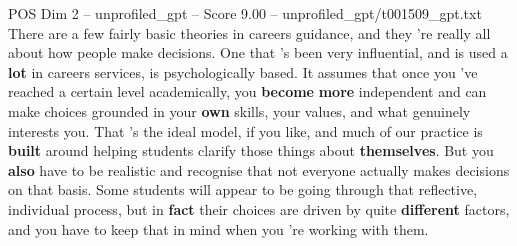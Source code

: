 \begin{textsample}{POS Dim 2 – unprofiled\_gpt – Score 9.00 – unprofiled\_gpt/t001509\_gpt.txt}  \label{ex:f2_pos_021}
There are a few fairly basic theories in careers guidance, and they ’re really all about how people make decisions.
One that ’s been very influential, and is used a \textbf{lot} in careers services, is psychologically based.
It assumes that once you ’ve reached a certain level academically, you \textbf{become} \textbf{more} independent and can make choices grounded in your \textbf{own} skills, your values, and what genuinely interests you.
That ’s the ideal model, if you like, and much of our practice is \textbf{built} around helping students clarify those things about \textbf{themselves}.
But you \textbf{also} have to be realistic and recognise that not everyone actually makes decisions on that basis.
Some students will appear to be going through that reflective, individual process, but in \textbf{fact} their choices are driven by quite \textbf{different} factors, and you have to keep that in mind when you ’re working with them.

\end{textsample}
